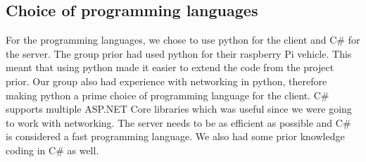 \subsection{Choice of programming languages}
For the programming languages, we chose to use python for the client and C\# for the server. The group prior had used python for their raspberry Pi vehicle. This meant that using python made it easier to extend the code from the project prior. Our group also had experience with networking in python, therefore making python a prime choice of programming language for the client. C\# supports multiple ASP.NET Core libraries which was useful since we were going to work with networking. The server needs to be as efficient as possible and C\# is considered a fast programming language. We also had some prior knowledge coding in C\# as well.